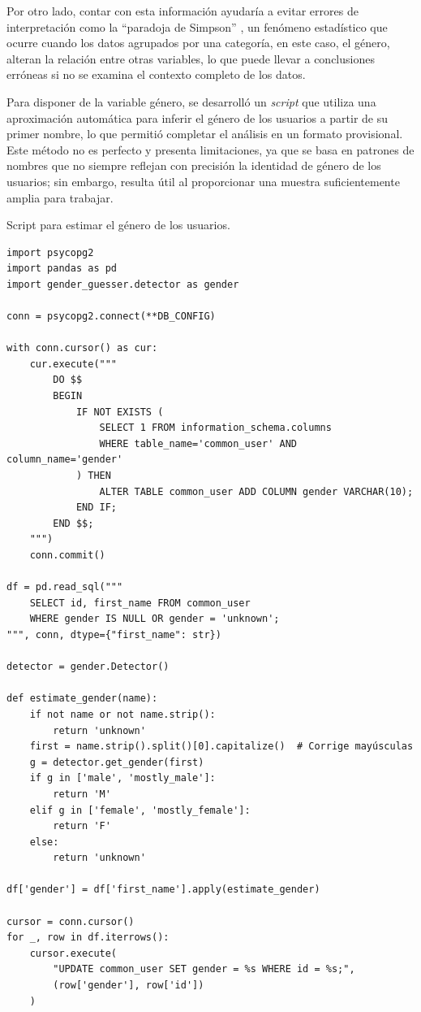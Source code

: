 \documentclass[a4paper, 12pt]{book}
\begin{document}
Por otro lado, contar con esta información ayudaría a evitar errores de interpretación como la “paradoja de Simpson” \cite{simpsonParadoxWikipedia}, un fenómeno estadístico que ocurre cuando los datos agrupados por una categoría, en este caso, el género, alteran la relación entre otras variables, lo que puede llevar a conclusiones erróneas si no se examina el contexto completo de los datos.

Para disponer de la variable género, se desarrolló un \textit{script} que utiliza una aproximación automática para inferir el género de los usuarios a partir de su primer nombre, lo que permitió completar el análisis en un formato provisional. Este método no es perfecto y presenta limitaciones, ya que se basa en patrones de nombres que no siempre reflejan con precisión la identidad de género de los usuarios; sin embargo, resulta útil al proporcionar una muestra suficientemente amplia para trabajar.

\begin{listing}[h!]
\caption{Script para estimar el género de los usuarios.}
\label{lst:genero_estimado}
\begin{verbatim}
import psycopg2
import pandas as pd
import gender_guesser.detector as gender

conn = psycopg2.connect(**DB_CONFIG)

with conn.cursor() as cur:
    cur.execute("""
        DO $$
        BEGIN
            IF NOT EXISTS (
                SELECT 1 FROM information_schema.columns 
                WHERE table_name='common_user' AND column_name='gender'
            ) THEN
                ALTER TABLE common_user ADD COLUMN gender VARCHAR(10);
            END IF;
        END $$;
    """)
    conn.commit()

df = pd.read_sql("""
    SELECT id, first_name FROM common_user 
    WHERE gender IS NULL OR gender = 'unknown';
""", conn, dtype={"first_name": str})

detector = gender.Detector()

def estimate_gender(name):
    if not name or not name.strip():
        return 'unknown'
    first = name.strip().split()[0].capitalize()  # Corrige mayúsculas
    g = detector.get_gender(first)
    if g in ['male', 'mostly_male']:
        return 'M'
    elif g in ['female', 'mostly_female']:
        return 'F'
    else:
        return 'unknown'

df['gender'] = df['first_name'].apply(estimate_gender)

cursor = conn.cursor()
for _, row in df.iterrows():
    cursor.execute(
        "UPDATE common_user SET gender = %s WHERE id = %s;",
        (row['gender'], row['id'])
    )
\end{verbatim}
\end{listing}
\end{document}
